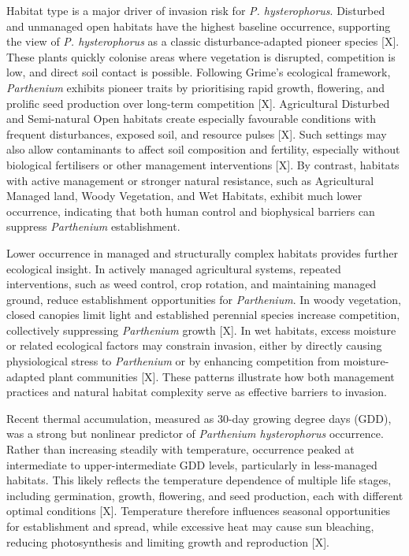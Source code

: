 Habitat type is a major driver of invasion risk for \textit{P. hysterophorus}. Disturbed and unmanaged open habitats have the highest baseline occurrence, supporting the view of \textit{P. hysterophorus} as a classic disturbance-adapted pioneer species [X]. These plants quickly colonise areas where vegetation is disrupted, competition is low, and direct soil contact is possible. Following Grime's ecological framework, \textit{Parthenium} exhibits pioneer traits by prioritising rapid growth, flowering, and prolific seed production over long-term competition [X]. Agricultural Disturbed and Semi-natural Open habitats create especially favourable conditions with frequent disturbances, exposed soil, and resource pulses [X]. Such settings may also allow contaminants to affect soil composition and fertility, especially without biological fertilisers or other management interventions [X]. By contrast, habitats with active management or stronger natural resistance, such as Agricultural Managed land, Woody Vegetation, and Wet Habitats, exhibit much lower occurrence, indicating that both human control and biophysical barriers can suppress \textit{Parthenium} establishment.

Lower occurrence in managed and structurally complex habitats provides further ecological insight. In actively managed agricultural systems, repeated interventions, such as weed control, crop rotation, and maintaining managed ground, reduce establishment opportunities for \textit{Parthenium}. In woody vegetation, closed canopies limit light and established perennial species increase competition, collectively suppressing \textit{Parthenium} growth [X]. In wet habitats, excess moisture or related ecological factors may constrain invasion, either by directly causing physiological stress to \textit{Parthenium} or by enhancing competition from moisture-adapted plant communities [X]. These patterns illustrate how both management practices and natural habitat complexity serve as effective barriers to invasion.

Recent thermal accumulation, measured as 30-day growing degree days (GDD), was a strong but nonlinear predictor of \textit{Parthenium hysterophorus} occurrence. Rather than increasing steadily with temperature, occurrence peaked at intermediate to upper-intermediate GDD levels, particularly in less-managed habitats. This likely reflects the temperature dependence of multiple life stages, including germination, growth, flowering, and seed production, each with different optimal conditions [X]. Temperature therefore influences seasonal opportunities for establishment and spread, while excessive heat may cause sun bleaching, reducing photosynthesis and limiting growth and reproduction [X].

